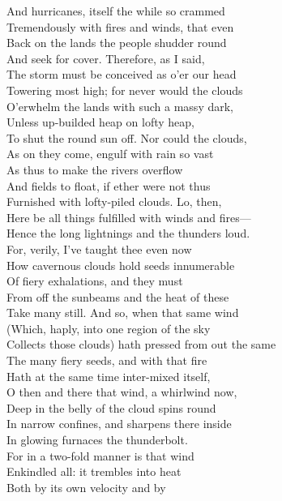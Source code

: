 And hurricanes, itself the while so crammed\\
Tremendously with fires and winds, that even\\
Back on the lands the people shudder round\\
And seek for cover. Therefore, as I said,\\
The storm must be conceived as o'er our head\\
Towering most high; for never would the clouds\\
O'erwhelm the lands with such a massy dark,\\
Unless up-builded heap on lofty heap,\\
To shut the round sun off. Nor could the clouds,\\
As on they come, engulf with rain so vast\\
As thus to make the rivers overflow\\
And fields to float, if ether were not thus\\
Furnished with lofty-piled clouds. Lo, then,\\
Here be all things fulfilled with winds and fires—\\
Hence the long lightnings and the thunders loud.\\
For, verily, I've taught thee even now\\
How cavernous clouds hold seeds innumerable\\
Of fiery exhalations, and they must\\
From off the sunbeams and the heat of these\\
Take many still. And so, when that same wind\\
(Which, haply, into one region of the sky\\
Collects those clouds) hath pressed from out the same\\
The many fiery seeds, and with that fire\\
Hath at the same time inter-mixed itself,\\
O then and there that wind, a whirlwind now,\\
Deep in the belly of the cloud spins round\\
In narrow confines, and sharpens there inside\\
In glowing furnaces the thunderbolt.\\
For in a two-fold manner is that wind\\
Enkindled all: it trembles into heat\\
Both by its own velocity and by\\
